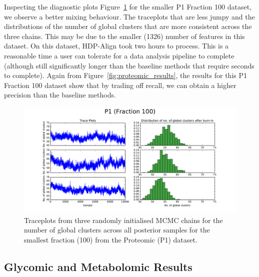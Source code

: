 Inspecting the diagnostic plots Figure~\ref{fig:traceplot_100} for the smaller P1 Fraction 100 dataset, we observe a better mixing behaviour. The traceplots that are less jumpy and the distributions of the number of global clusters that are more consistent across the three chains. This may be due to the smaller (1326) number of features in this dataset. On this dataset, HDP-Align took two hours to process. This is a reasonable time a user can tolerate for a data analysis pipeline to complete (although still significantly longer than the baseline methods that require seconds to complete). Again from Figure~\ref{fig:proteomic_results}, the results for this P1 Fraction 100 dataset show that by trading off recall, we can obtain a higher precision than the baseline methods.

\begin{figure}[!htbp]
\centering\includegraphics[width=0.7\linewidth]{06-hdp/figures/traceplot_p1_100.pdf}
\centering\caption{\label{fig:traceplot_100}Traceplots from three randomly initialised MCMC chains for the number of global clusters across all posterior samples for the smallest fraction (100) from the Proteomic (P1) dataset.}
\end{figure}


\subsection{Glycomic and Metabolomic Results}
\label{sub:glycomic-metabolomic-results}

